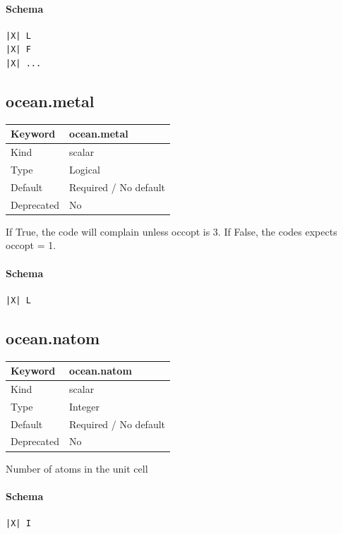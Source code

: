 \documentclass[11pt]{article}
\begin{document}
{{{{{\paragraph{Schema}
\begin{Verbatim}
|X| L
|X| F
|X| ...
\end{Verbatim}

\subsection{ocean.metal}
\label{kw:ocean-metal}
\begin{longtable}{|p{1.5in}|p{4.5in}|}
\hline
Keyword & ocean.metal \\
\hline
Kind & scalar \\
\hline
Type & Logical \\
\hline
Default & Required / No default \\
\hline
Deprecated & No \\
\hline
\end{longtable}
 If True, the code will complain unless occopt is 3. If False, the codes
 expects occopt = 1.

\paragraph{Schema}
\begin{Verbatim}
|X| L
\end{Verbatim}

\subsection{ocean.natom}
\label{kw:ocean-natom}
\begin{longtable}{|p{1.5in}|p{4.5in}|}
\hline
Keyword & ocean.natom \\
\hline
Kind & scalar \\
\hline
Type & Integer \\
\hline
Default & Required / No default \\
\hline
Deprecated & No \\
\hline
\end{longtable}
 Number of atoms in the unit cell

\paragraph{Schema}
\begin{Verbatim}
|X| I
\end{Verbatim}

}}}}}
\end{document}
